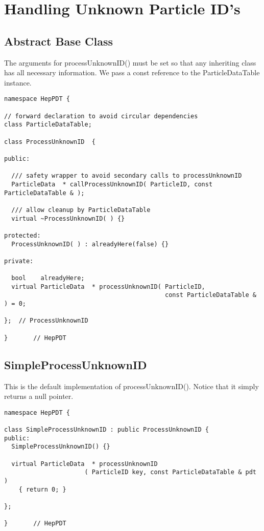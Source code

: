 \section { Handling Unknown Particle ID's }
\label{unknownID}

\subsection { Abstract Base Class }

The arguments for processUnknownID() must be set so that any
inheriting class has all necessary information. 
We pass a const reference to the ParticleDataTable instance.  

\begin{verbatim}
namespace HepPDT {

// forward declaration to avoid circular dependencies
class ParticleDataTable;

class ProcessUnknownID  {

public:

  /// safety wrapper to avoid secondary calls to processUnknownID
  ParticleData  * callProcessUnknownID( ParticleID, const ParticleDataTable & );

  /// allow cleanup by ParticleDataTable
  virtual ~ProcessUnknownID( ) {}

protected:
  ProcessUnknownID( ) : alreadyHere(false) {}

private: 

  bool    alreadyHere;
  virtual ParticleData  * processUnknownID( ParticleID, 
                                            const ParticleDataTable & ) = 0;

};  // ProcessUnknownID

}       // HepPDT
\end{verbatim}


\subsection { SimpleProcessUnknownID }

This is the default implementation of processUnknownID().
Notice that it simply returns a null pointer.

\begin{verbatim}
namespace HepPDT {

class SimpleProcessUnknownID : public ProcessUnknownID {
public:
  SimpleProcessUnknownID() {}

  virtual ParticleData  * processUnknownID
                      ( ParticleID key, const ParticleDataTable & pdt )
    { return 0; }
    
};

}       // HepPDT
\end{verbatim}


